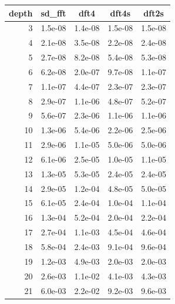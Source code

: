 \documentclass[a4paper]{article}
\begin{document}
\begin{table}[h!]
    \centering
    \begin{tabular}{|r|*{4}{c|}}
        \hline
        \rowcolor{myGray}
        depth & sd\_fft & dft4 & dft4s & dft2s \\
        \hline
        \cellcolor{myGray} 3 & 1.5e-08 & 1.4e-08 & 1.5e-08 & 1.5e-08 \\
        \hline
        \cellcolor{myGray} 4 & 2.1e-08 & 3.5e-08 & 2.2e-08 & 2.4e-08 \\
        \hline
        \cellcolor{myGray} 5 & 2.7e-08 & 8.2e-08 & 5.4e-08 & 5.3e-08 \\
        \hline
        \cellcolor{myGray} 6 & 6.2e-08 & 2.0e-07 & 9.7e-08 & 1.1e-07 \\
        \hline
        \cellcolor{myGray} 7 & 1.1e-07 & 4.4e-07 & 2.3e-07 & 2.3e-07 \\
        \hline
        \cellcolor{myGray} 8 & 2.9e-07 & 1.1e-06 & 4.8e-07 & 5.2e-07 \\
        \hline
        \cellcolor{myGray} 9 & 5.6e-07 & 2.3e-06 & 1.1e-06 & 1.1e-06 \\
        \hline
        \cellcolor{myGray} 10 & 1.3e-06 & 5.4e-06 & 2.2e-06 & 2.5e-06 \\
        \hline
        \cellcolor{myGray} 11 & 2.9e-06 & 1.1e-05 & 5.0e-06 & 5.0e-06 \\
        \hline
        \cellcolor{myGray} 12 & 6.1e-06 & 2.5e-05 & 1.0e-05 & 1.1e-05 \\
        \hline
        \cellcolor{myGray} 13 & 1.3e-05 & 5.3e-05 & 2.4e-05 & 2.4e-05 \\
        \hline
        \cellcolor{myGray} 14 & 2.9e-05 & 1.2e-04 & 4.8e-05 & 5.0e-05 \\
        \hline
        \cellcolor{myGray} 15 & 6.1e-05 & 2.4e-04 & 1.0e-04 & 1.1e-04 \\
        \hline
        \cellcolor{myGray} 16 & 1.3e-04 & 5.2e-04 & 2.0e-04 & 2.2e-04 \\
        \hline
        \cellcolor{myGray} 17 & 2.7e-04 & 1.1e-03 & 4.5e-04 & 4.6e-04 \\
        \hline
        \cellcolor{myGray} 18 & 5.8e-04 & 2.4e-03 & 9.1e-04 & 9.6e-04 \\
        \hline
        \cellcolor{myGray} 19 & 1.2e-03 & 4.9e-03 & 2.0e-03 & 2.0e-03 \\
        \hline
        \cellcolor{myGray} 20 & 2.6e-03 & 1.1e-02 & 4.1e-03 & 4.3e-03 \\
        \hline
        \cellcolor{myGray} 21 & 6.0e-03 & 2.2e-02 & 9.2e-03 & 9.6e-03 \\

\end{tabular}
\end{table}
\end{document}
